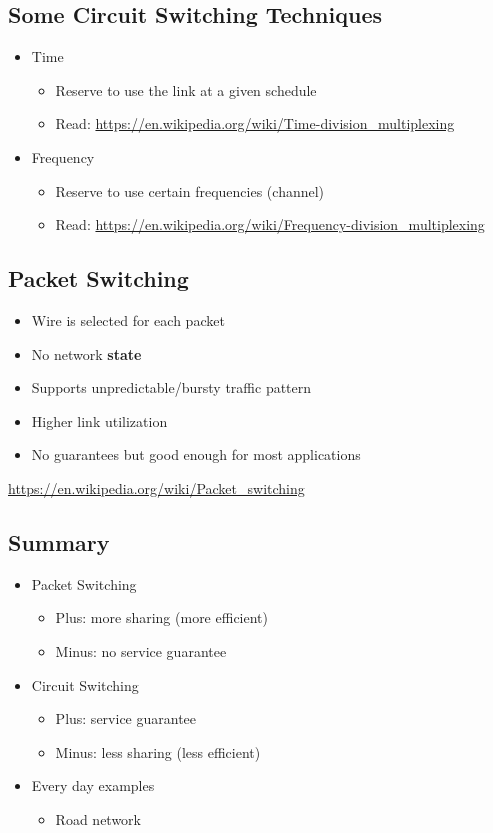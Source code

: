 \subsection{Some Circuit Switching Techniques}
\begin{itemize}[nosep]
    \item Time
          \begin{itemize}[nosep]
              \item Reserve to use the link at a given schedule
              \item Read: \url{https://en.wikipedia.org/wiki/Time-division_multiplexing}
          \end{itemize}
    \item Frequency
          \begin{itemize}[nosep]
              \item Reserve to use certain frequencies (channel)
              \item Read: \url{https://en.wikipedia.org/wiki/Frequency-division_multiplexing}
          \end{itemize}
\end{itemize}
\subsection{Packet Switching}
\begin{itemize}[nosep]
    \item Wire is selected for each packet
    \item No network \textbf{state}
    \item Supports unpredictable/bursty traffic pattern
    \item Higher link utilization
    \item No guarantees but good enough for most applications
\end{itemize}
\url{https://en.wikipedia.org/wiki/Packet_switching}
\subsection{Summary}
\begin{itemize}[nosep]
    \item Packet Switching
          \begin{itemize}[nosep]
              \item Plus: more sharing (more efficient)
              \item Minus: no service guarantee
          \end{itemize}
    \item Circuit Switching
          \begin{itemize}[nosep]
              \item Plus: service guarantee
              \item Minus: less sharing (less efficient)
          \end{itemize}
    \item Every day examples
          \begin{itemize}[nosep]
              \item Road network
          \end{itemize}
\end{itemize}

